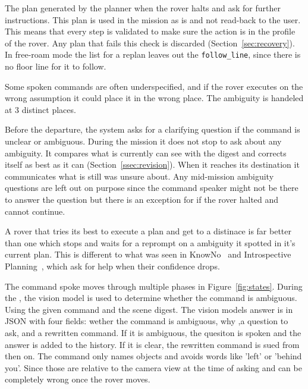 The plan generated by the planner when the rover halts and ask for further instructions. This plan is used in the mission as is and not read-back to the user. This means that every step is validated 
to make sure the action is in the profile of the rover. Any plan that fails this check is discarded (Section~\ref{sec:recovery}). In free-roam mode the list for
a replan leaves out the \texttt{follow\_line}, since there is no floor line for it to follow.



\label{sec:clarification_design}


Some spoken commands are often underspecified, and if the rover executes on the wrong assumption it could place it in the wrong place.
The ambiguity is handeled at 3 distinct places. 

Before the departure, the system asks for a clarifying question if the command is unclear or ambiguous. During the mission it does not stop
to ask about any ambiguity. It compares what is currently can see with the digest and corrects itself as best as it can (Section~\ref{ssec:revision}).
When it reaches its destination it communicates what is still was unsure about. Any mid-mission ambiguity questions are left out on purpose since the command
speaker might not be there to answer the question but there is an exception for if the rover halted and cannot continue.

A rover that tries its best to execute a plan and get to a distinace is far better than one which stops and waits for a reprompt on a ambiguity it spotted in it's
current plan. This is different to what was seen in KnowNo~\cite{ren2023knowno} and Introspective Planning~\cite{liang2024introspective}, which ask for help
when their confidence drops.

\label{ssec:statemachine}

The command spoke moves through multiple phases in Figure~\ref{fig:states}. 
During the , the vision model is used to determine whether the command is ambiguous. Using the given command and the scene digest. 
The vision models answer is in JSON with four fields: wether the command is ambiguous, why ,a question to ask, and  a rewritten command. If it is ambiguous, the quesiton is
spoken and the answer is added to the history. If it is clear, the rewritten command is sued from then on. The command only names objects and avoids words like 'left' or 'behind you'. 
Since those are relative to the camera view at the time of asking and can be completely wrong once the rover moves.

